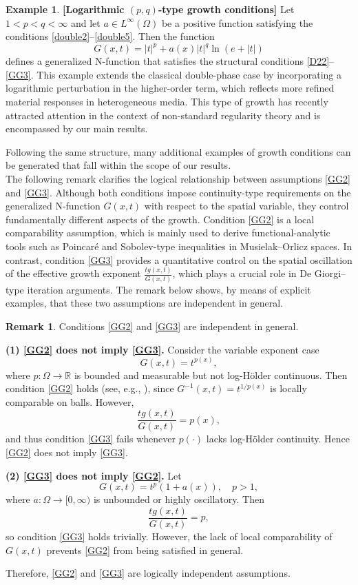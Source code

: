 \documentclass[10pt,reqno]{amsart}
\newcommand *\w{^\wedge}
\theoremstyle{definition}
\newtheorem{example}[thm]{Example}
\newtheorem{remark}[theorem]{Remark}
\numberwithin{equation}{section}
\begin{document}
\begin{example}{\rm\bf{[Logarithmic \((p,q)\)-type growth conditions]}} \label{ex8}
Let \(1 < p < q < \infty\) and let \(a \in L^\infty(\Omega)\) be a positive function satisfying the conditions \eqref{double2}--\eqref{double5}. Then the function
\[
G(x,t) = |t|^{p} + a(x)|t|^{q} \ln(e + |t|)
\]
defines a generalized \textnormal{N}-function that satisfies the structural conditions \eqref{D22}--\eqref{GG3}. This example extends the classical double-phase case by incorporating a logarithmic perturbation in the higher-order term, which reflects more refined material responses in heterogeneous media. This type of growth has recently attracted attention in the context of non-standard regularity theory and is encompassed by our main results.
\end{example}
Following the same structure, many additional examples of growth conditions can be generated that fall within the scope of our results.\\

The following remark clarifies the logical relationship between assumptions
\eqref{GG2} and \eqref{GG3}. Although both conditions impose continuity-type
requirements on the generalized $\mathrm{N}$-function $G(x,t)$ with respect to the
spatial variable, they control fundamentally different aspects of the growth.
Condition \eqref{GG2} is a local comparability assumption, which is mainly used to
derive functional-analytic tools such as Poincaré and Sobolev-type inequalities in
Musielak--Orlicz spaces. In contrast, condition \eqref{GG3} provides a quantitative
control on the spatial oscillation of the effective growth exponent
$\frac{t g(x,t)}{G(x,t)}$, which plays a crucial role in De Giorgi--type iteration
arguments. The remark below shows, by means of explicit examples, that these two
assumptions are independent in general.

\begin{remark}\label{RemH}
Conditions \eqref{GG2} and \eqref{GG3} are independent in general.

\smallskip
\noindent
\textbf{(1) \eqref{GG2} does not imply \eqref{GG3}.}
Consider the variable exponent case
\[
G(x,t)=t^{p(x)},
\]
where $p:\Omega\to\mathbb{R}$ is bounded and measurable but not log-Hölder continuous.
Then condition \eqref{GG2} holds (see, e.g., \cite{Harjulehto2019}), since
$G^{-1}(x,t)=t^{1/p(x)}$ is locally comparable on balls. However,
\[
\frac{t g(x,t)}{G(x,t)}=p(x),
\]
and thus condition \eqref{GG3} fails whenever $p(\cdot)$ lacks log-Hölder
continuity. Hence \eqref{GG2} does not imply \eqref{GG3}.

\smallskip
\noindent
\textbf{(2) \eqref{GG3} does not imply \eqref{GG2}.}
Let
\[
G(x,t)=t^p(1+a(x)),
\quad p>1,
\]
where $a:\Omega\to[0,\infty)$ is unbounded or highly oscillatory.
Then
\[
\frac{t g(x,t)}{G(x,t)}= p,
\]
so condition \eqref{GG3} holds trivially. However, the lack of local comparability
of $G(x,t)$ prevents \eqref{GG2} from being satisfied in general.

\smallskip
Therefore, \eqref{GG2} and \eqref{GG3} are logically independent assumptions.
\end{remark}
\end{document}
